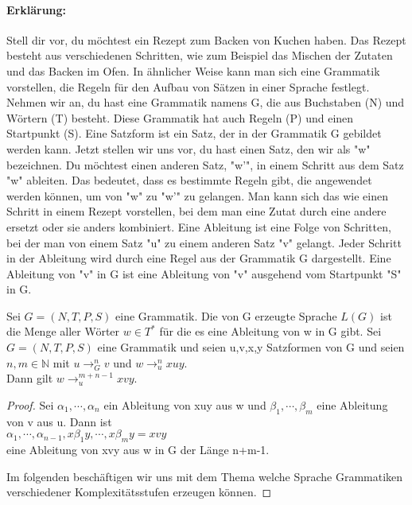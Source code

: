     \paragraph{Erklärung:}
        Stell dir vor, du möchtest ein Rezept zum Backen von Kuchen haben. Das Rezept besteht aus verschiedenen Schritten, wie zum Beispiel das Mischen der Zutaten und das Backen im Ofen. In ähnlicher Weise kann man sich eine Grammatik vorstellen, die Regeln für den Aufbau von Sätzen in einer Sprache festlegt. Nehmen wir an, du hast eine Grammatik namens G, die aus Buchstaben (N) und Wörtern (T) besteht. Diese Grammatik hat auch Regeln (P) und einen Startpunkt (S). Eine Satzform ist ein Satz, der in der Grammatik G gebildet werden kann. Jetzt stellen wir uns vor, du hast einen Satz, den wir als "w" bezeichnen. Du möchtest einen anderen Satz, "w'", in einem Schritt aus dem Satz "w" ableiten. Das bedeutet, dass es bestimmte Regeln gibt, die angewendet werden können, um von "w" zu "w'" zu gelangen. Man kann sich das wie einen Schritt in einem Rezept vorstellen, bei dem man eine Zutat durch eine andere ersetzt oder sie anders kombiniert. Eine Ableitung ist eine Folge von Schritten, bei der man von einem Satz "u" zu einem anderen Satz "v" gelangt. Jeder Schritt in der Ableitung wird durch eine Regel aus der Grammatik G dargestellt. Eine Ableitung von "v" in G ist eine Ableitung von "v" ausgehend vom Startpunkt "S" in G. %
    
    
    Sei \(G=(N,T,P,S)\) eine Grammatik. Die von G erzeugte Sprache \(L(G)\) ist die Menge aller Wörter \(w\in T^*\) für die es eine Ableitung von w in G gibt.
    Sei \(G=(N,T,P,S)\) eine Grammatik und seien u,v,x,y Satzformen von G und seien \(n,m\in\mathbb{N}\) mit \(u\to_G^nv\) und \(w\to_u^nxuy\).\\
    Dann gilt \(w\to_u^{m+n-1}xvy\).
\begin{proof}
    Sei \(\alpha _1,\cdots,\alpha_n\) ein Ableitung von xuy aus w und \(\beta_1,\cdots,\beta_m\) eine Ableitung von v aus u. Dann ist\\ 
    \(\alpha_1,\cdots,\alpha_{n-1},x\beta_1y,\cdots,x\beta_my=xvy\)\\
    eine Ableitung von xvy aus w in G der Länge n+m-1.\par\bigskip
    Im folgenden beschäftigen wir uns mit dem Thema welche Sprache Grammatiken verschiedener Komplexitätsstufen erzeugen können.
\end{proof}

